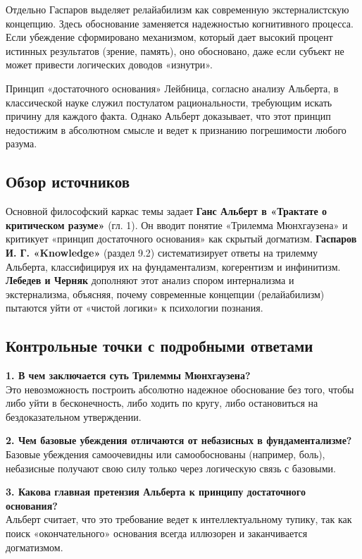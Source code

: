 \documentclass[a4paper,12pt]{article}
\begin{document}
Отдельно Гаспаров выделяет релайабилизм как современную экстерналистскую концепцию. Здесь обоснование заменяется надежностью когнитивного процесса. Если убеждение сформировано механизмом, который дает высокий процент истинных результатов (зрение, память), оно обосновано, даже если субъект не может привести логических доводов «изнутри».

Принцип «достаточного основания» Лейбница, согласно анализу Альберта, в классической науке служил постулатом рациональности, требующим искать причину для каждого факта. Однако Альберт доказывает, что этот принцип недостижим в абсолютном смысле и ведет к признанию погрешимости любого разума.

\subsection{Обзор источников}

Основной философский каркас темы задает \textbf{Ганс Альберт в «Трактате о критическом разуме»} (гл. 1). Он вводит понятие «Трилемма Мюнхгаузена» и критикует «принцип достаточного основания» как скрытый догматизм. \textbf{Гаспаров И. Г. «Knowledge»} (раздел 9.2) систематизирует ответы на трилемму Альберта, классифицируя их на фундаментализм, когерентизм и инфинитизм. \textbf{Лебедев и Черняк} дополняют этот анализ спором интернализма и экстернализма, объясняя, почему современные концепции (релайабилизм) пытаются уйти от «чистой логики» к психологии познания.

\subsection{Контрольные точки с подробными ответами}

\textbf{1. В чем заключается суть Трилеммы Мюнхгаузена?}\\
Это невозможность построить абсолютно надежное обоснование без того, чтобы либо уйти в бесконечность, либо ходить по кругу, либо остановиться на бездоказательном утверждении.

\textbf{2. Чем базовые убеждения отличаются от небазисных в фундаментализме?}\\
Базовые убеждения самоочевидны или самообоснованы (например, боль), небазисные получают свою силу только через логическую связь с базовыми.

\textbf{3. Какова главная претензия Альберта к принципу достаточного основания?}\\
Альберт считает, что это требование ведет к интеллектуальному тупику, так как поиск «окончательного» основания всегда иллюзорен и заканчивается догматизмом.
\end{document}
